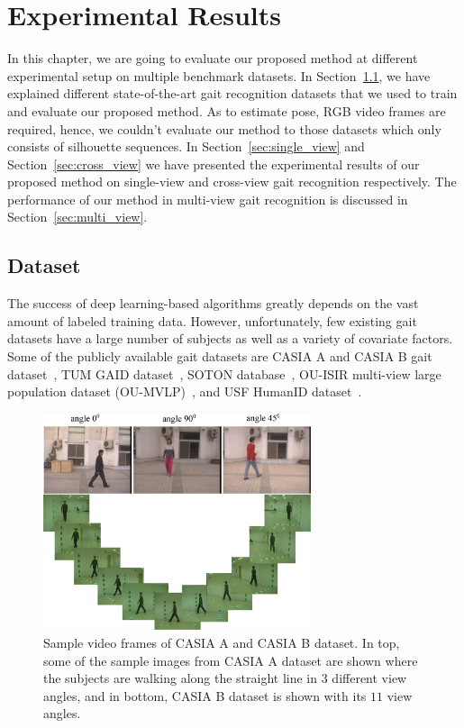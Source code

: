 \chapter{Experimental Results}\label{ch:experimental_result}
In this chapter, we are going to evaluate our proposed method at different experimental setup on multiple benchmark datasets. In Section~\ref{sec:datasets}, we have explained different state-of-the-art gait recognition datasets that we used to train and evaluate our proposed method. As to estimate pose, RGB video frames are required, hence, we couldn't evaluate our method to those datasets which only consists of silhouette sequences.  In Section~\ref{sec:single_view} and Section~\ref{sec:cross_view} we have presented the experimental results of our proposed method on single-view and cross-view gait recognition respectively. The performance of our method in multi-view gait recognition is discussed in Section~\ref{sec:multi_view}.

\section{Dataset} \label{sec:datasets}
The success of deep learning-based algorithms greatly depends on the vast amount of labeled training data. However, unfortunately, few existing gait datasets have a large number of subjects as well as a variety of covariate factors. Some of the publicly available gait datasets are CASIA A and CASIA B gait dataset~\cite{Yu_06}, TUM GAID dataset~\cite{Hofmann_14}, SOTON database~\cite{Shutler_04}, OU-ISIR multi-view large population dataset (OU-MVLP)~\cite{Noriko_18}, and USF HumanID dataset~\cite{Sarkar_05}. 

\begin{figure}
	\centering
	\includegraphics[width = 0.7\textwidth]{figures/casia_dataset.eps}
	\caption [Sample video frames of CASIA A and CASIA B dataset]
	{Sample video frames of CASIA A and CASIA B dataset. In top, some of the sample images from CASIA A dataset are shown where the subjects are walking along the straight line in $ 3 $ different view angles, and in bottom, CASIA B dataset is shown with its $ 11 $ view angles.
	}
	\label{fig:casia_dataset}
\end{figure} 

